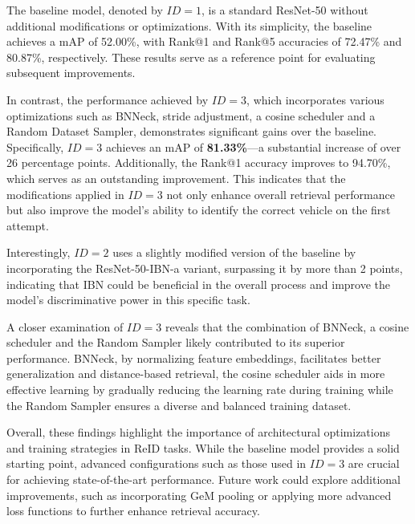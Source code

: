 The baseline model, denoted by $ID = 1$, is a standard ResNet-50 without additional modifications or optimizations. With its simplicity, the baseline achieves a mAP of 52.00\%, with Rank@1 and Rank@5 accuracies of 72.47\% and 80.87\%, respectively. These results serve as a reference point for evaluating subsequent improvements.

In contrast, the performance achieved by $ID = 3$, which incorporates various optimizations such as BNNeck, stride adjustment, a cosine scheduler and a Random Dataset Sampler, demonstrates significant gains over the baseline. Specifically, $ID = 3$ achieves an mAP of \textbf{81.33\%}—a substantial increase of over 26 percentage points. Additionally, the Rank@1 accuracy improves to 94.70\%, which serves as an outstanding improvement. This indicates that the modifications applied in $ID = 3$ not only enhance overall retrieval performance but also improve the model's ability to identify the correct vehicle on the first attempt.

Interestingly, $ID = 2$ uses a slightly modified version of the baseline by incorporating the ResNet-50-IBN-a variant, surpassing it by more than 2 points, indicating that IBN could be beneficial in the overall process and improve the model's discriminative power in this specific task.

A closer examination of $ID = 3$ reveals that the combination of BNNeck, a cosine scheduler and the Random Sampler likely contributed to its superior performance. BNNeck, by normalizing feature embeddings, facilitates better generalization and distance-based retrieval, the cosine scheduler aids in more effective learning by gradually reducing the learning rate during training while the Random Sampler ensures a diverse and balanced training dataset.

Overall, these findings highlight the importance of architectural optimizations and training strategies in ReID tasks. While the baseline model provides a solid starting point, advanced configurations such as those used in $ID = 3$ are crucial for achieving state-of-the-art performance. Future work could explore additional improvements, such as incorporating GeM pooling or applying more advanced loss functions to further enhance retrieval accuracy.

